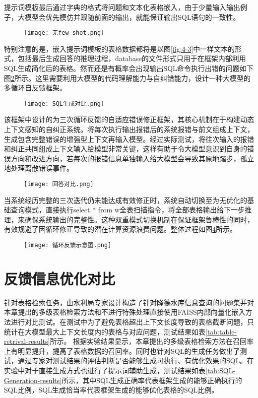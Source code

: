 提示词模板最后通过字典的格式将问题和文本化表格嵌入，由于少量输入输出例子，大模型会优先模仿并跟随前面的输出，就能保证输出SQL语句的一致性。
\begin{figure}[!htbp]
    \centering
    \texttt{[image: 无few-shot.png]}
    \label{fig:4-4}
\end{figure}
特别注意的是，嵌入提示词模板的表格数据都将是以图\ref{fig:4-3}中一样文本的形式，包括最后生成回答的推理过程，database的文件形式只用于在框架内部利用SQL生成简化后的表格。然而还是有概率会出现输出SQL命令执行出错的问题如下图\ref{fig:4-5}所示。这里需要利用大模型的代码理解能力与自纠错能力，设计一种大模型的多循环自反馈框架。
\begin{figure}[!htbp]
    \centering
    \texttt{[image: SQL生成对比.png]}
    \label{fig:4-5}
\end{figure}

该框架中设计的为三次循环反馈的自适应错误修正框架，其核心机制在于构建动态上下文感知的自纠正系统。将每次执行输出报错后的系统报错与前文组成上下文，生成包含完整错误的增强型上下文再输入模型。经过实际测试，将往次输入的报错和纠正共同组成上下文输入给模型非常关键，这样有助于令大模型意识到自身的错误方向和改进方向，若每次的报错信息单独输入给大模型会导致其原地踏步，孤立地处理离散错误事件。
\begin{figure}[!htb]
    \centering
    \texttt{[image: 回答对比.png]}
    \label{fig:4-7}
\end{figure}
当系统经历完整的三次迭代仍未能达成有效修正时，系统自动切换至为无优化的基础查询模式，直接执行select * from w全表扫描指令，将全部表格输出给下一步推理，来确保系统输出的完整性。这种双重模式切换机制在保证框架鲁棒性的同时，有效规避了因循环修正导致的潜在计算资源浪费问题。整体过程如图\ref{fig:4-6}所示。
\begin{figure}[htbp]
    \centering
    \texttt{[image: 循环反馈示意图.png]}
    \label{fig:4-6}
\end{figure}

\section{反馈信息优化对比}
针对表格检索任务，由水利局专家设计构造了针对隆德水库信息查询的问题集并对本章提出的多级表格检索方法和不进行特殊处理直接使用FAISS内部向量化嵌入方法进行对比测试。在测试中为了避免表格超出上下文长度导致的表格截断问题，只统计在大模型最大上下文长度内的表格与对应问题，测试结果如表\ref{tab:table-retrival-results}所示。
根据实验结果显示，本章提出的多级表格检索方法在召回率上有明显提升，提高了表格数据的召回率。同时也针对SQL的生成任务做出了测试，通过专家对测试结果的评估判断是否能够生成可执行、有优化效果的SQL。在实验中对于直接生成方式也进行了提示词辅助生成，测试结果如表\ref{tab:SQL-Generation-results}所示，其中SQL生成正确率代表框架生成的能够正确执行的SQL比例，SQL生成恰当率代表框架生成的能够优化表格的SQL比例。

